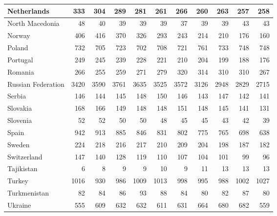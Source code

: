 \begin{table}
\begin{tabular}{|l|r|r|r|r|r|r|r|r|r|r|}
                   Netherlands&    333&    304&    289&    281&    261&    266&    260&    263&    257&    258\\\hline
               North Macedonia&     48&     40&     39&     39&     39&     37&     39&     39&     43&     43\\\hline
                        Norway&    406&    416&    370&    326&    293&    243&    214&    210&    176&    160\\\hline
                        Poland&    732&    705&    723&    702&    708&    721&    761&    733&    748&    748\\\hline
                      Portugal&    249&    245&    239&    228&    221&    210&    204&    199&    188&    176\\\hline
                       Romania&    266&    255&    259&    271&    279&    320&    314&    310&    310&    267\\\hline
            Russian Federation&   3420&   3590&   3761&   3635&   3525&   3572&   3126&   2948&   2829&   2715\\\hline
                        Serbia&    146&    144&    145&    148&    150&    146&    143&    147&    142&    141\\\hline
                      Slovakia&    168&    166&    149&    148&    148&    151&    148&    145&    141&    131\\\hline
                      Slovenia&     52&     52&     50&     50&     48&     45&     45&     43&     42&     39\\\hline
                         Spain&    942&    913&    885&    846&    831&    802&    775&    765&    698&    638\\\hline
                        Sweden&    224&    218&    216&    217&    210&    209&    204&    198&    187&    182\\\hline
                   Switzerland&    147&    140&    128&    119&    110&    107&    104&    101&     99&     96\\\hline
                    Tajikistan&      6&      8&      9&      9&     10&      9&     11&     13&     13&     13\\\hline
                        Turkey&   1016&    930&    986&   1009&   1013&    998&    995&    988&   1002&   1027\\\hline
                  Turkmenistan&     82&     84&     86&     93&     88&     84&     80&     82&     87&     80\\\hline
                       Ukraine&    555&    609&    632&    632&    611&    631&    664&    680&    682&    559\\\hline

\end{tabular}
\end{table}
